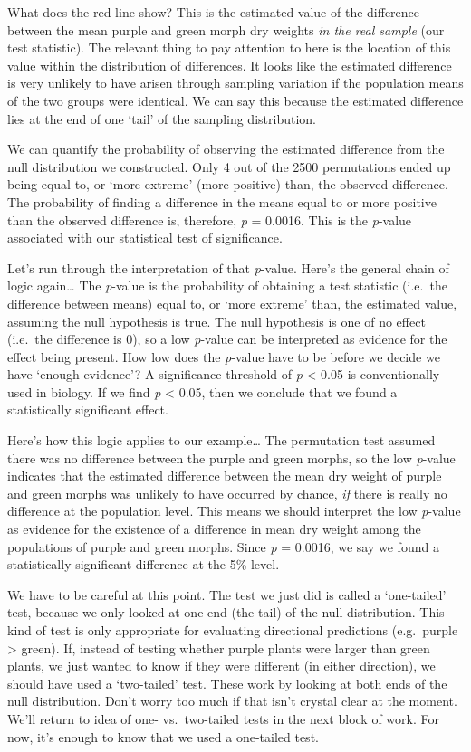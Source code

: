 \documentclass[]{book}
\begin{document}
What does the red line show? This is the estimated value of the
difference between the mean purple and green morph dry weights \emph{in
the real sample} (our test statistic). The relevant thing to pay
attention to here is the location of this value within the distribution
of differences. It looks like the estimated difference is very unlikely
to have arisen through sampling variation if the population means of the
two groups were identical. We can say this because the estimated
difference lies at the end of one `tail' of the sampling distribution.

We can quantify the probability of observing the estimated difference
from the null distribution we constructed. Only 4 out of the 2500
permutations ended up being equal to, or `more extreme' (more positive)
than, the observed difference. The probability of finding a difference
in the means equal to or more positive than the observed difference is,
therefore, \emph{p} = 0.0016. This is the \emph{p}-value associated with
our statistical test of significance.

Let's run through the interpretation of that \emph{p}-value. Here's the
general chain of logic again\ldots{} The \emph{p}-value is the
probability of obtaining a test statistic (i.e.~the difference between
means) equal to, or `more extreme' than, the estimated value, assuming
the null hypothesis is true. The null hypothesis is one of no effect
(i.e.~the difference is 0), so a low \emph{p}-value can be interpreted
as evidence for the effect being present. How low does the
\emph{p}-value have to be before we decide we have `enough evidence'? A
significance threshold of \emph{p} \textless{} 0.05 is conventionally
used in biology. If we find \emph{p} \textless{} 0.05, then we conclude
that we found a statistically significant effect.

Here's how this logic applies to our example\ldots{} The permutation
test assumed there was no difference between the purple and green
morphs, so the low \emph{p}-value indicates that the estimated
difference between the mean dry weight of purple and green morphs was
unlikely to have occurred by chance, \emph{if} there is really no
difference at the population level. This means we should interpret the
low \emph{p}-value as evidence for the existence of a difference in mean
dry weight among the populations of purple and green morphs. Since
\emph{p} = 0.0016, we say we found a statistically significant
difference at the 5\% level.

We have to be careful at this point. The test we just did is called a
`one-tailed' test, because we only looked at one end (the tail) of the
null distribution. This kind of test is only appropriate for evaluating
directional predictions (e.g.~purple \textgreater{} green). If, instead
of testing whether purple plants were larger than green plants, we just
wanted to know if they were different (in either direction), we should
have used a `two-tailed' test. These work by looking at both ends of the
null distribution. Don't worry too much if that isn't crystal clear at
the moment. We'll return to idea of one- vs.~two-tailed tests in the
next block of work. For now, it's enough to know that we used a
one-tailed test.
\end{document}
